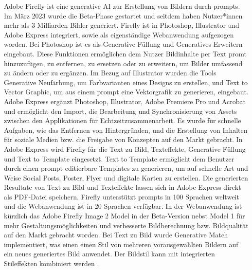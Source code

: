 Adobe Firefly ist eine generative AI zur Erstellung von Bildern durch prompts. Im März 2023 wurde die Beta-Phase gestartet und seitdem haben Nutzer*innen mehr als 3 Milliarden Bilder generiert. Firefly ist in Photoshop, Illustrator und Adobe Express integriert, sowie als eigenständige Webanwendung aufgezogen worden. Bei Photoshop ist es als Generative Füllung und Generatives Erweitern eingebaut. Diese Funktionen ermöglichen dem Nutzer Bildinhalte per Text promt hinzuzufügen, zu entfernen, zu ersetzen oder zu erweitern, um Bilder umfassend zu ändern oder zu ergänzen. Im Bezug auf Illustrator wurden die Tools Generative Neufärbung, um Farbvarianten eines Designs zu erstellen, und Text to Vector Graphic, um aus einem prompt eine Vektorgrafik zu generieren, eingebaut. Adobe Express ergänzt Photoshop, Illustrator, Adobe Premiere Pro und Acrobat und ermöglicht den Import, die Bearbeitung und Synchronisierung von Assets zwischen den Applikationen für Echtzeitzusammenarbeit. Es wurde für schnelle Aufgaben, wie das Entfernen von Hintergründen, und die Erstellung von Inhalten für soziale Medien bzw. die Freigabe von Konzepten auf den Markt gebracht. In Adobe Express wird Firefly für die Text zu Bild, Texteffekte, Generative Füllung und Text to Template eingesetzt. Text to Template ermöglicht dem Benutzer durch einen prompt editierbare Templates zu generieren, um auf schnelle Art und Weise Social Posts, Poster, Flyer und digitale Karten zu erstellen. Die generierten Resultate von Text zu Bild und Texteffekte lassen sich in Adobe Express direkt als PDF-Datei speichern. Firefly unterstützt prompts in 100 Sprachen weltweit und die Webanwendung ist in 20 Sprachen verfügbar. In der Webanwendung ist kürzlich das Adobe Firefly Image 2 Model in der Beta-Version nebst Model 1 für mehr Gestaltungsmöglichkeiten und verbesserte Bildberechnung bzw. Bildqualität auf den Markt gebracht worden. Bei Text zu Bild wurde Generative Match implementiert, was einen einen Stil von mehreren vorausgewählten Bildern auf ein neues generiertes Bild anwendet. Der Bildstil kann mit integrierten Stileffekten kombiniert werden \cite{adobe-firefly}.     












